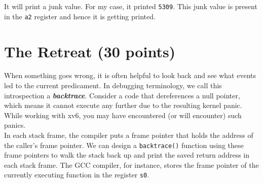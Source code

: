 \documentclass[11pt]{exam}
\begin{document}
\begin{questions}
\begin{parts}
\begin{solution}
        It will print a junk value. For my case, it printed {\tt 5309}. This junk value is present in the {\tt a2} register and hence it is getting printed.
    
    \end{solution}

	\end{parts}
\end{questions}

\section{The Retreat (30 points)}

When something goes wrong, it is often helpful to look back and see what events led to the current predicament. In debugging terminology, we call this introspection a \textbf{{\em backtrace}}. Consider a code that dereferences a null pointer, which means it cannot execute any further due to the resulting kernel panic. While working with xv6, you may have encountered (or will encounter) such panics. \\

\noindent In each stack frame, the compiler puts a frame pointer that holds the address of the caller's frame pointer. We can design a \texttt{backtrace()} function using these frame pointers to walk the stack back up and print the saved return address in each stack frame. The GCC compiler, for instance, stores the frame pointer of the currently executing function in the register {\tt s0}. 
\end{document}
